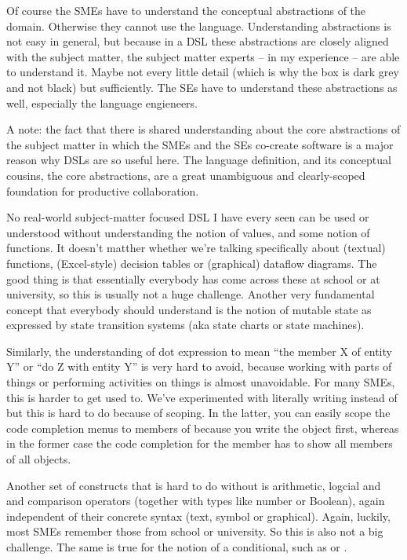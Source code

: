 \documentclass[runningheads]{llncs}
\newcommand{\ic}[1]{\changefont{cmtt}{m}{n}{#1}\normalfont}  %
\newcommand{\changefont}[3]{\fontfamily{#1}\fontseries{#2}\fontshape{#3}\selectfont}
\begin{document}
Of course the SMEs have to understand the conceptual abstractions of the domain.
Otherwise they cannot use the language.
Understanding abstractions is not easy in general, but because in a DSL these
abstractions are closely aligned with the subject matter, the subject matter
experts -- in my experience -- are able to understand it. Maybe not every little
detail (which is why the box is dark grey and not black) but sufficiently. The
SEs have to understand these abstractions as well, especially the language
engieneers. 

A note: the fact that there is shared understanding about the core abstractions
of the subject matter in which the SMEs and the SEs co-create software is a major
reason why DSLs are so useful here. The language definition, and its conceptual
cousins, the core abstractions, are a great unambiguous and clearly-scoped
foundation for productive collaboration.

No real-world subject-matter focused DSL I have every seen can be used or
understood without understanding the notion of values, and some notion of
functions. It doesn't matther whether we're talking specifically about (textual)
functions, (Excel-style) decision tables or (graphical) dataflow diagrams. The
good thing is that essentially everybody has come across these at school or
at university, so this is usually not a huge challenge. Another very fundamental
concept that everybody should understand is the notion of mutable state
as expressed by state transition systems (aka state charts or state machines).

Similarly, the understanding of dot expression to mean ``the member X of entity
Y'' or ``do Z with entity Y'' is very hard to avoid, because working with parts
of things or performing activities on things is almost unavoidable. For many
SMEs, this is harder to get used to. We've experimented with literally writing
\ic{member of object} instead of \ic{object.member} but this is hard to do 
because of scoping. In the latter, you can easily scope the code completion
menus to members of \ic{object} because you write the object first, whereas
in the former case the code completion for the member has to show all members
of all objects.

Another set of constructs that is hard to do without is arithmetic, logcial
and and comparison operators (together with types like number or Boolean), 
again independent of their concrete syntax (text, symbol or graphical). Again,
luckily, most SMEs remember those from school or university. So this is also
not a big challenge. The same is true for the notion of a conditional, such
as \ic{if \ldots then} or \ic{switch\{case, case, case\}}. 
\end{document}
